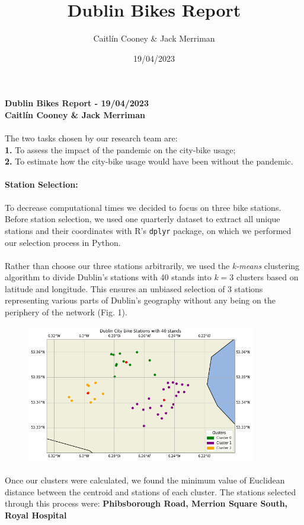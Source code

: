 \documentclass[11pt,letterpaper]{article}
\title{Dublin Bikes Report}
\date{19/04/2023}
\author{Caitlín Cooney \& Jack Merriman}
\begin{document}
	\noindent \textbf{Dublin Bikes Report - 19/04/2023}\\
	\textbf{Caitlín Cooney \& Jack Merriman}
\paragraph{}
	The two tasks chosen by our research team are:\\
	\textbf{1.} To assess the impact of the pandemic on the city-bike usage;\\
	\textbf{2.} To estimate how the city-bike usage would have been without the pandemic.
\paragraph{Station Selection:}
	To decrease computational times we decided to focus on three bike stations. Before station selection, we used one quarterly dataset to extract all unique stations and their coordinates with R’s \texttt{dplyr} package, on which we performed our selection process in Python.
\paragraph{}
	Rather than choose our three stations arbitrarily, we used the \textit{k-means} clustering algorithm to divide Dublin’s stations with 40 stands into $k = 3$ clusters based on latitude and longitude. This ensures an unbiased selection of $3$ stations representing various parts of Dublin’s geography without any being on the periphery of the network (Fig. 1).\\
\begin{figure}[h]
	\centering
	\includegraphics[width=10cm]{kmeans.png}
\end{figure}
\paragraph{}
	Once our clusters were calculated, we found the minimum value of Euclidean distance between the centroid and stations of each cluster. The stations selected through this process were: \textbf{Phibsborough Road, Merrion Square South, Royal Hospital}
\end{document}
